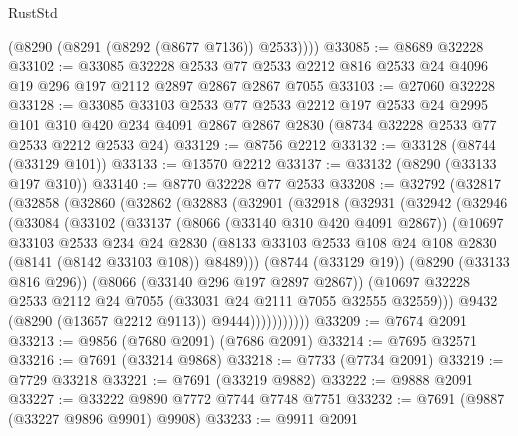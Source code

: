 \begin{lexlean}{RustStd}
\begin{coremodule}
        (@8290 (@8291 (@8292 (@8677 @7136)) @2533))))
@33085 := @8689 @32228
@33102 := @33085
    @32228
    @2533
    @77
    @2533
    @2212
    @816
    @2533
    @24
    @4096
    @19
    @296
    @197
    @2112
    @2897
    @2867
    @2867
    @7055
@33103 := @27060 @32228
@33128 := @33085
    @33103
    @2533
    @77
    @2533
    @2212
    @197
    @2533
    @24
    @2995
    @101
    @310
    @420
    @234
    @4091
    @2867
    @2867
    @2830
    (@8734 @32228 @2533 @77 @2533 @2212 @2533 @24)
@33129 := @8756 @2212
@33132 := @33128 (@8744 (@33129 @101))
@33133 := @13570 @2212
@33137 := @33132 (@8290 (@33133 @197 @310))
@33140 := @8770 @32228 @77 @2533
@33208 := @32792
    (@32817
      (@32858
        (@32860
          (@32862
            (@32883
              (@32901
                (@32918
                  (@32931
                    (@32942
                      (@32946
                        (@33084
                          (@33102
                            (@33137
                              (@8066 (@33140 @310 @420 @4091 @2867))
                              (@10697
                                @33103
                                @2533
                                @234
                                @24
                                @2830
                                (@8133
                                  @33103
                                  @2533
                                  @108
                                  @24
                                  @108
                                  @2830
                                  (@8141 (@8142 @33103 @108))
                                  @8489)))
                            (@8744 (@33129 @19))
                            (@8290 (@33133 @816 @296))
                            (@8066 (@33140 @296 @197 @2897 @2867))
                            (@10697
                              @32228
                              @2533
                              @2112
                              @24
                              @7055
                              (@33031 @24 @2111 @7055 @32555 @32559)))
                          @9432
                          (@8290 (@13657 @2212 @9113))
                          @9444)))))))))))
@33209 := @7674 @2091
@33213 := @9856 (@7680 @2091) (@7686 @2091)
@33214 := @7695 @32571
@33216 := @7691 (@33214 @9868)
@33218 := @7733 (@7734 @2091)
@33219 := @7729 @33218
@33221 := @7691 (@33219 @9882)
@33222 := @9888 @2091
@33227 := @33222 @9890 @7772 @7744 @7748 @7751
@33232 := @7691 (@9887 (@33227 @9896 @9901) @9908)
@33233 := @9911 @2091

\end{coremodule}
\end{lexlean}
